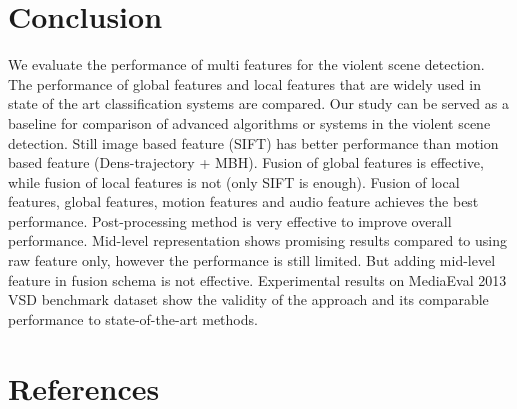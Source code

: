 \documentclass[review]{elsarticle}
\begin{document}
\section{Conclusion}
We evaluate the performance of multi features for the violent scene detection. The performance of global features and local features that are widely used in state of the art classification systems are compared. Our study can be served as a baseline for comparison of advanced algorithms or systems in the violent scene detection. Still image based feature (SIFT) has better performance than motion based feature (Dens-trajectory + MBH).  Fusion of global features is effective, while fusion of local features is not (only SIFT is enough). Fusion of local features, global features, motion features and audio feature achieves the best performance. Post-processing method is very effective to improve overall performance. Mid-level representation shows promising results compared to using raw feature only, however the performance is still limited. But adding mid-level feature in fusion schema is not effective. Experimental results on MediaEval 2013 VSD benchmark dataset show the validity of the approach and its comparable performance to state-of-the-art methods.

\section*{References}


\end{document}
